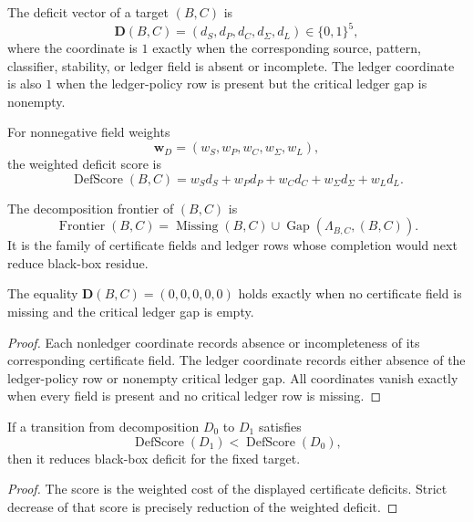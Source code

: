 \begin{definition}
\label{def:philosophy-deficit-vector}
The deficit vector of a target $(B,C)$ is
$$
\mathbf D(B,C)
=
(d_S,d_P,d_C,d_\Sigma,d_L)\in\{0,1\}^5,
$$
where the coordinate is $1$ exactly when the corresponding source,
pattern, classifier, stability, or ledger field is absent or incomplete.
The ledger coordinate is also $1$ when the ledger-policy row is present
but the critical ledger gap is nonempty.
\end{definition}

\begin{definition}
\label{def:philosophy-weighted-deficit-score}
For nonnegative field weights
$$
\mathbf w_D=(w_S,w_P,w_C,w_\Sigma,w_L),
$$
the weighted deficit score is
$$
\operatorname{DefScore}(B,C)
=
w_Sd_S+w_Pd_P+w_Cd_C+w_\Sigma d_\Sigma+w_Ld_L.
$$
\end{definition}

\begin{definition}
\label{def:philosophy-decomposition-frontier}
The decomposition frontier of $(B,C)$ is
$$
\operatorname{Frontier}(B,C)
=
\operatorname{Missing}(B,C)\cup
\operatorname{Gap}(\Lambda_{B,C},(B,C)).
$$
It is the family of certificate fields and ledger rows whose completion
would next reduce black-box residue.
\end{definition}

\begin{theorem}
\label{thm:philosophy-zero-deficit-field-ledger-closure}
The equality $\mathbf D(B,C)=(0,0,0,0,0)$ holds exactly when no
certificate field is missing and the critical ledger gap is empty.
\end{theorem}
\begin{proof}
Each nonledger coordinate records absence or incompleteness of its
corresponding certificate field. The ledger coordinate records either
absence of the ledger-policy row or nonempty critical ledger gap. All
coordinates vanish exactly when every field is present and no critical
ledger row is missing.
\end{proof}

\begin{theorem}
\label{thm:philosophy-decomposition-improvement-reduces-deficit}
If a transition from decomposition $D_0$ to $D_1$ satisfies
$$
\operatorname{DefScore}(D_1)<\operatorname{DefScore}(D_0),
$$
then it reduces black-box deficit for the fixed target.
\end{theorem}
\begin{proof}
The score is the weighted cost of the displayed certificate deficits.
Strict decrease of that score is precisely reduction of the weighted
deficit.
\end{proof}

